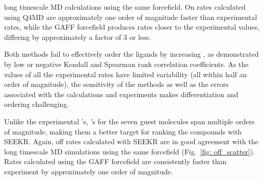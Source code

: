 long timescale MD calculations using the same forcefield.
On rates calculated using Q4MD are approximately one order of magnitude faster
than experimental rates, while the GAFF forcefield produces rates closer to the
experimental values, differing by approximately a factor of 3 or less.

\par Both methods fail to effectively order the ligands by increasing \kon,
as demonstrated by low or negative Kendall and Spearman rank correlation coefficients.
As the values of all the experimental rates have limited variability (all within
half an order of magnitude), the sensitivity of the methods as well as the errors
associated with the calculations and experiments makes differentiation and
ordering challenging.


\par Unlike the experimental \kon's, \koff's for the seven guest
molecules span multiple orders of magnitude, making them a better target for
ranking the compounds with SEEKR.
Again, off rates calculated with SEEKR are in good agreement with the long
timescale MD simulations using the same forcefield (Fig.~\ref{fig: off_scatter}). Rates calculated using the
GAFF forcefield are consistently faster than experiment by approximately one
order of magnitude.

